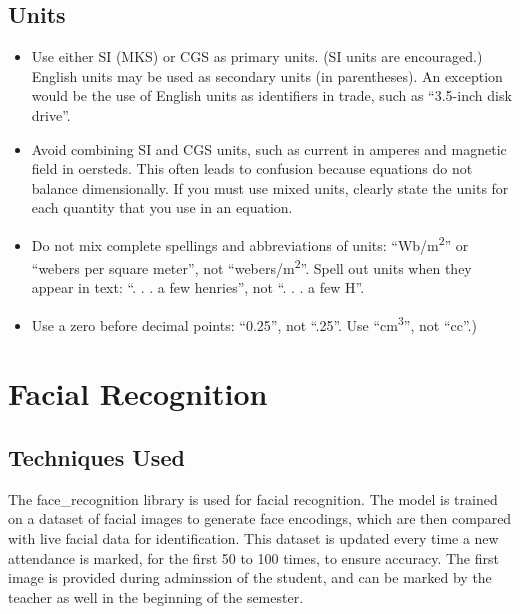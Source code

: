 \documentclass[conference]{IEEEtran}
\begin{document}
\subsection{Units}
\begin{itemize}
    \item Use either SI (MKS) or CGS as primary units. (SI units are encouraged.) English units may be used as secondary units (in parentheses). An exception would be the use of English units as identifiers in trade, such as ``3.5-inch disk drive''.
    \item Avoid combining SI and CGS units, such as current in amperes and magnetic field in oersteds. This often leads to confusion because equations do not balance dimensionally. If you must use mixed units, clearly state the units for each quantity that you use in an equation.
    \item Do not mix complete spellings and abbreviations of units: ``Wb/m\textsuperscript{2}'' or ``webers per square meter'', not ``webers/m\textsuperscript{2}''. Spell out units when they appear in text: ``. . . a few henries'', not ``. . . a few H''.
    \item Use a zero before decimal points: ``0.25'', not ``.25''. Use ``cm\textsuperscript{3}'', not ``cc''.)
\end{itemize}


\section{Facial Recognition}

\subsection{Techniques Used}
The face\_recognition \cite{6} library is used for facial recognition. The model is trained on a dataset of facial images to generate face encodings, which are then compared with live facial data for identification. This dataset is updated every time a new attendance is marked, for the first 50 to 100 times, to ensure accuracy. The first image is provided during adminssion of the student, and can be marked by the teacher as well in the beginning of the semester.
\end{document}
